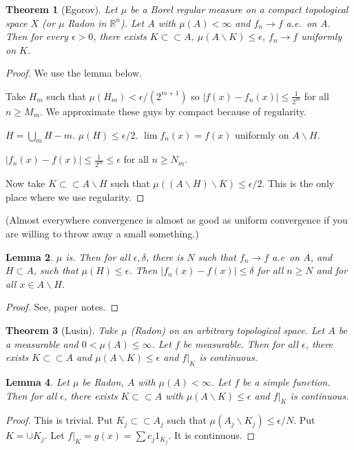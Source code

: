 \documentclass[11pt]{article}
\newtheorem{thm}{Theorem}[section]
\newtheorem{lem}[thm]{Lemma}
\newcommand{\ra}{\rightarrow}
\newcommand{\sbs}{\subset}
\newcommand{\bs}{\backslash}
\newcommand{\de}{\delta}
\newcommand{\ep}{\epsilon}
\newcommand{\bcu}[2]{\bigcup_{#1}^{#2}}
\newcommand{\fr}[2]{\frac{#1}{#2}}
\newcommand{\re}{\mathbb{R}}
\begin{document}
\begin{thm}[Egorov]
Let $\mu$ be a Borel regular measure on a compact topological space $X$ (or $\mu$ Radon in $\re^n$). Let $A$ with $\mu(A)<\infty$ and $f_n\ra f$ a.e.\ on $A$. Then for every $\ep>0$, there exists $K\sbs\sbs A$, $\mu(A\bs K)\le \ep$, $f_n\ra f$ uniformly on $K$.
\end{thm}
\begin{proof}
We use the lemma below.

Take $H_m$ such that $\mu(H_m)<\ep/(2^{m+1})$ so $|f(x)-f_n(x)|\le\fr{1}{2^m}$ for all $n\ge M_m$. We approximate these guys by compact because of regularity.

$H=\bcu{m}{}H-m$. $\mu(H)\le \ep/2$. $\lim f_n(x)=f(x)$ uniformly on $A\bs H$. 

$|f_n(x)-f(x)|\le \fr{1}{2^m}\le \ep$ for all $n\ge N_m$. 

Now take $K\sbs\sbs A\bs H$ such that $\mu((A\bs H)\bs K)\le \ep/2$. This is the only place where we use regularity.

\end{proof}


(Almost everywhere convergence is almost as good as uniform convergence if you are willing to throw away a small something.)

\begin{lem}
$\mu$ is. Then for all $\ep,\de$, there is $N$ such that $f_n\ra f$ a.e\ on $A$, and $H\sbs A$, such that $\mu(H)\le\ep$. Then $|f_n(x)-f(x)|\le \de$ for all $n\ge N$ and for all $x\in A\bs H$. 
\end{lem}
\begin{proof}
See, paper notes.
\end{proof}

\begin{thm}[Lusin]
Take $\mu$ (Radon) on an arbitrary topological space. Let $A$ be a measurable and $0<\mu(A)\le\infty$. Let $f$ be measurable. Then for all $\ep$, there exists $K\sbs\sbs A$ and $\mu(A\bs K)\le \ep$ and $f|_K$ is continuous. 
\end{thm}

\begin{lem}
Let $\mu$ be Radon, $A$ with $\mu(A)<\infty$. Let $f$ be a simple function. 
Then for all $\ep$, there exists $K\sbs\sbs A$ with $\mu(A\bs K)\le \ep$ and $f|_K$ is continuous. 
\end{lem}
\begin{proof}
This is trivial. Put $K_j\sbs\sbs A_j$ such that $\mu(A_j\bs K_j)\le \ep/N$. Put $K=\cup K_j$. Let $f|_K=g(x)=\sum c_j1_{K_j}$. It is continuous. 
\end{proof}
\end{document}
